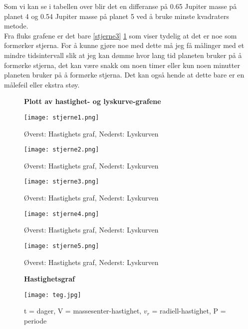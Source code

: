 \documentclass[12pt,preprint]{aastex6}
\begin{document}
Som vi kan se i tabellen over blir det en differanse på 0.65 Jupiter masse på planet 4 og 0.54 Jupiter masse på planet 5 ved å bruke minste kvadraters metode. \\

Fra fluks grafene er det bare \ref{stjerne3} \ref{stjerne4} som viser tydelig at det er noe som formørker stjerna. For å kunne gjøre noe med dette må jeg få målinger med et mindre tidsintervall slik at jeg kan dømme hvor lang tid planeten bruker på å formørke stjerna, det kan være snakk om noen timer eller kun noen minutter planeten bruker på å formørke stjerna. Det kan også hende at dette bare er en målefeil eller ekstra støy. 

\begin{figure}[ht]
\begin{center}
\textbf{Plott av hastighet- og lyskurve-grafene}\par\medskip
\end{center}
\begin{minipage}[b]{0.45\linewidth}
\centering
\texttt{[image: stjerne1.png]}
\caption{Øverst: Hastighets graf, Nederst: Lyskurven}
\label{stjerne0}
\end{minipage}
\hspace{0.5cm}
\begin{minipage}[b]{0.45\linewidth}
\centering
\texttt{[image: stjerne2.png]}
\caption{Øverst: Hastighets graf, Nederst: Lyskurven}
\label{stjerne1}
\end{minipage}
\begin{minipage}[b]{0.45\linewidth}
\centering
\texttt{[image: stjerne3.png]}
\caption{Øverst: Hastighets graf, Nederst: Lyskurven}
\label{stjerne2}
\end{minipage}
\begin{minipage}[b]{0.45\linewidth}
\centering
\texttt{[image: stjerne4.png]}
\caption{Øverst: Hastighets graf, Nederst: Lyskurven}
\label{stjerne3}
\end{minipage}
\begin{minipage}[b]{0.45\linewidth}
\centering
\texttt{[image: stjerne5.png]}
\caption{Øverst: Hastighets graf, Nederst: Lyskurven}
\label{stjerne4}
\end{minipage}
\end{figure}

\begin{figure}
\centering
\textbf{Hastighetsgraf}\par\medskip
\texttt{[image: teg.jpg]} 
\caption{t = dager, V = massesenter-hastighet, $v_r$ = radiell-hastighet, P = periode}
\label{teg}
\end{figure}
\end{document}
